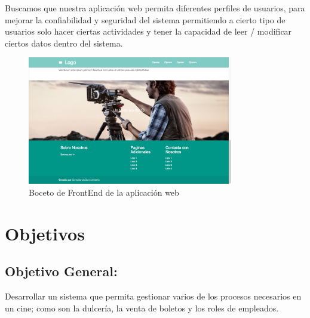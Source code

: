 \documentclass[12pt, fleqn]{report}                             %
\begin{document}
        Buscamos que nuestra aplicación web permita diferentes perfiles de usuarios, para mejorar la confiabilidad
        y seguridad del sistema permitiendo a cierto tipo de usuarios solo hacer ciertas actividades y 
        tener la capacidad de leer / modificar ciertos datos dentro del sistema.



        \begin{figure}[h!]
            \centering
            \includegraphics[width=0.80\textwidth]{Examples2.png}
            \caption{Boceto de FrontEnd de la aplicación web}
        \end{figure}




    \clearpage
    \section{Objetivos}


        \subsection{Objetivo General:}

            Desarrollar un sistema que permita gestionar varios de los procesos necesarios en un cine;
            como son la dulcería, la venta de boletos y los roles de empleados.


\end{document}
